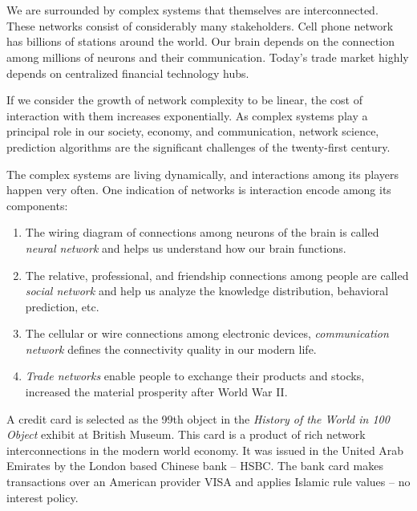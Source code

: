 \chapter{\bevezetes}

We are surrounded by complex systems that themselves are interconnected.
These networks consist of considerably many stakeholders.
Cell phone network has billions of stations around the world.
Our brain depends on the connection among millions of neurons and their communication.
Today's trade market highly depends on centralized financial technology hubs.

If we consider the growth of network complexity to be linear, the cost of interaction with them increases exponentially.
As complex systems play a principal role in our society, economy, and communication, network science, prediction algorithms are the significant challenges of the twenty-first century.

The complex systems are living dynamically, and interactions among its players happen very often.
One indication of networks is interaction encode among its components\cite{barabasi2016network}:

\begin{enumerate}
  \item The wiring diagram of connections among neurons of the brain is called \textit{neural network} and helps us understand how our brain functions.
  \item The relative, professional, and friendship connections among people are called \textit{social network} and help us analyze the knowledge distribution, behavioral prediction, etc.
  \item The cellular or wire connections among electronic devices, \textit{communication network} defines the connectivity quality in our modern life.
  \item \textit{Trade networks} enable people to exchange their products and stocks, increased the material prosperity after World War II.
\end{enumerate}

A credit card is selected as the 99th object in the \textit{History of the World in 100 Object} exhibit at British Museum.
This card is a product of rich network interconnections in the modern world economy.
It was issued in the United Arab Emirates by the London based Chinese bank -- HSBC.
The bank card makes transactions over an American provider VISA and applies Islamic rule values -- no interest policy\cite{barabasi2016network}.


